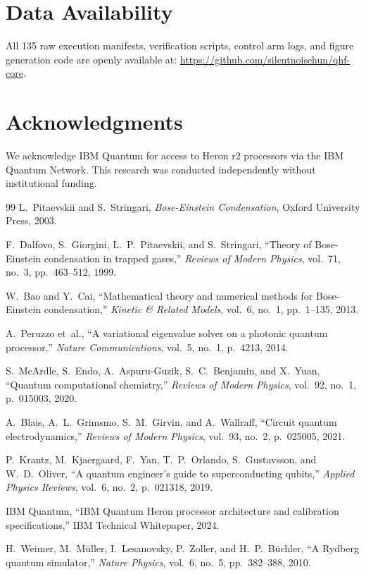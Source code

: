 \documentclass[11pt,a4paper]{article}
\begin{document}
\section*{Data Availability}

All 135 raw execution manifests, verification scripts, control arm logs, and figure generation code are openly available at: \url{https://github.com/silentnoisehun/qhf-core}.

\section*{Acknowledgments}

We acknowledge IBM Quantum for access to Heron r2 processors via the IBM Quantum Network. This research was conducted independently without institutional funding.

\begin{thebibliography}{99}
L.~Pitaevskii and S.~Stringari,
\emph{Bose-Einstein Condensation},
Oxford University Press, 2003.

F.~Dalfovo, S.~Giorgini, L.~P.~Pitaevskii, and S.~Stringari,
``Theory of Bose-Einstein condensation in trapped gases,''
\emph{Reviews of Modern Physics}, vol.~71, no.~3, pp.~463--512, 1999.

W.~Bao and Y.~Cai,
``Mathematical theory and numerical methods for Bose-Einstein condensation,''
\emph{Kinetic \& Related Models}, vol.~6, no.~1, pp.~1--135, 2013.

A.~Peruzzo et~al.,
``A variational eigenvalue solver on a photonic quantum processor,''
\emph{Nature Communications}, vol.~5, no.~1, p.~4213, 2014.

S.~McArdle, S.~Endo, A.~Aspuru-Guzik, S.~C.~Benjamin, and X.~Yuan,
``Quantum computational chemistry,''
\emph{Reviews of Modern Physics}, vol.~92, no.~1, p.~015003, 2020.

A.~Blais, A.~L.~Grimsmo, S.~M.~Girvin, and A.~Wallraff,
``Circuit quantum electrodynamics,''
\emph{Reviews of Modern Physics}, vol.~93, no.~2, p.~025005, 2021.

P.~Krantz, M.~Kjaergaard, F.~Yan, T.~P.~Orlando, S.~Gustavsson, and W.~D.~Oliver,
``A quantum engineer's guide to superconducting qubits,''
\emph{Applied Physics Reviews}, vol.~6, no.~2, p.~021318, 2019.

IBM Quantum,
``IBM Quantum Heron processor architecture and calibration specifications,''
IBM Technical Whitepaper, 2024.

H.~Weimer, M.~M\"uller, I.~Lesanovsky, P.~Zoller, and H.~P.~B\"uchler,
``A Rydberg quantum simulator,''
\emph{Nature Physics}, vol.~6, no.~5, pp.~382--388, 2010.
\end{thebibliography}
\end{document}
